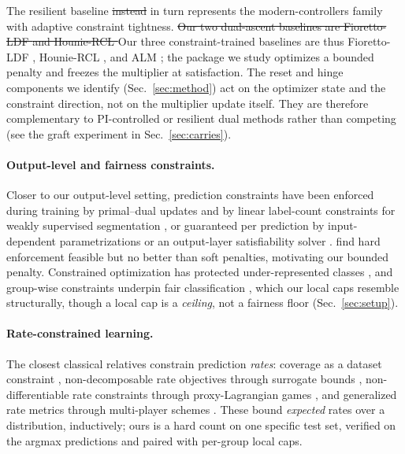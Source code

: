 \documentclass[10pt]{article}
\newcommand{\del}[1]{{\color{red}\sout{#1}}}
\begin{document}
The resilient baseline \del{instead}{\color{blue} in turn}
represents the modern-controllers family with adaptive constraint
tightness. \del{Our two dual-ascent baselines are Fioretto-LDF
\mbox{\citep{fioretto2020lagrangian}} and Hounie-RCL \mbox{\citep{hounie2023resilient}}}%
{\color{blue}Our three constraint-trained baselines are thus Fioretto-LDF
\citep{fioretto2020lagrangian}, Hounie-RCL \citep{hounie2023resilient}, and ALM
\citep{bertsekas1982constrained}};
the package we study optimizes a bounded penalty and freezes the
multiplier at satisfaction. The reset and hinge components we identify
(Sec.~\ref{sec:method}) act on the optimizer state and the constraint
direction, not on the multiplier update itself. They are therefore
complementary to PI-controlled or resilient dual methods rather than
competing (see the graft experiment in Sec.~\ref{sec:carries}).

\paragraph{Output-level and fairness constraints.}
Closer to our output-level setting, prediction constraints have been enforced
during training by primal--dual updates \citep{nandwani2019primal} and by
linear label-count constraints for weakly supervised segmentation
\citep{pathak2015constrained}, or guaranteed per prediction by
input-dependent parametrizations \citep{brosowsky2021sample} or an
output-layer satisfiability solver \citep{goyal2024deepsade}.
\citet{marquez2017imposing} find hard enforcement feasible but no better than
soft penalties, motivating our bounded penalty. Constrained optimization has
protected under-represented classes \citep{sangalli2021constrained}, and
group-wise constraints underpin fair classification
\citep{bilal2015fairness,agarwal2018reductions,kearns2018preventing,donini2018empirical},
which our local caps resemble structurally, though a local cap is a
\emph{ceiling}, not a fairness floor (Sec.~\ref{sec:setup}).

\paragraph{Rate-constrained learning.}
The closest classical relatives constrain prediction \emph{rates}:
coverage as a dataset constraint \citep{goh2016satisfying}, non-decomposable
rate objectives through surrogate bounds \citep{eban2017scalable},
non-differentiable rate constraints through proxy-Lagrangian games
\citep{cotter2019optimization}, and generalized rate metrics through
multi-player schemes \citep{narasimhan2019optimizing}. These bound
\emph{expected} rates over a distribution, inductively; ours is a hard count
on one specific test set, verified on the argmax predictions and paired with
per-group local caps.
\end{document}
